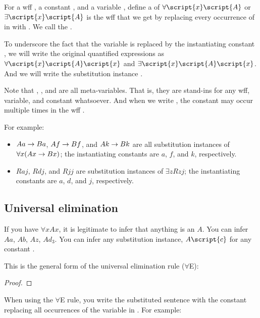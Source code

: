 For a wff , a constant , and a variable , define a  of $\forall \script{x}\script{A}$ or $\exists \script{x}\script{A}$ is the wff that we get by replacing every occurrence of  in  with . We call  the .

To underscore the fact that the variable  is replaced by the instantiating constant , we will write the original quantified expressions as $\forall \script{x}\script{A}\script{x}$ and $\exists \script{x}\script{A}\script{x}$. And we will write the substitution instance .

Note that , , and  are all meta-variables. That is, they are stand-ins for any wff, variable, and constant whatsoever. And when we write , the constant  may occur multiple times in the wff .


For example:

\begin{itemize}
\item $Aa \rightarrow Ba$, $Af \rightarrow Bf$, and $Ak \rightarrow Bk$ are all substitution instances of $\forall x(Ax \rightarrow Bx)$; the instantiating constants are $a$, $f$, and $k$, respectively.
\item $Raj$, $Rdj$, and $Rjj$ are substitution instances of $\exists zRzj$; the instantiating constants are $a$, $d$, and $j$, respectively.
\end{itemize}

\subsection{Universal elimination}

If you have $\forall x Ax$, it is legitimate to infer that anything is an $A$. You can infer $Aa$, $Ab$, $Az$, $Ad_3$. You can infer any substitution instance, $A\script{c}$ for any constant .

This is the general form of the universal elimination rule ($\forall$E):

\begin{proof}
	 
\end{proof}

When using the $\forall$E rule, you write the substituted sentence with the constant  replacing all occurrences of the variable  in . For example:

